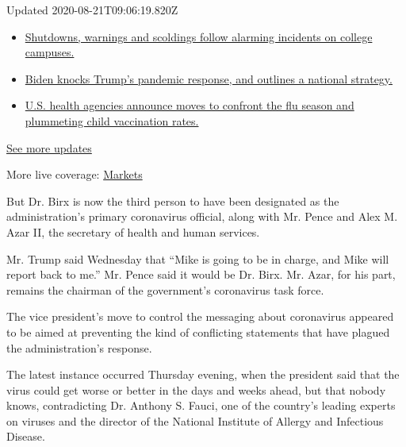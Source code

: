 Updated 2020-08-21T09:06:19.820Z

\begin{itemize}
\tightlist
\item
  \href{https://www.nytimes3xbfgragh.onion/2020/08/20/world/coronavirus-covid.html?action=click\&pgtype=Article\&state=default\&region=MAIN_CONTENT_1\&context=storylines_live_updates\#link-68774d88}{Shutdowns,
  warnings and scoldings follow alarming incidents on college campuses.}
\item
  \href{https://www.nytimes3xbfgragh.onion/2020/08/20/world/coronavirus-covid.html?action=click\&pgtype=Article\&state=default\&region=MAIN_CONTENT_1\&context=storylines_live_updates\#link-26b58724}{Biden
  knocks Trump's pandemic response, and outlines a national strategy.}
\item
  \href{https://www.nytimes3xbfgragh.onion/2020/08/20/world/coronavirus-covid.html?action=click\&pgtype=Article\&state=default\&region=MAIN_CONTENT_1\&context=storylines_live_updates\#link-4e542da3}{U.S.
  health agencies announce moves to confront the flu season and
  plummeting child vaccination rates.}
\end{itemize}

\href{https://www.nytimes3xbfgragh.onion/2020/08/20/world/coronavirus-covid.html?action=click\&pgtype=Article\&state=default\&region=MAIN_CONTENT_1\&context=storylines_live_updates}{See
more updates}

More live coverage:
\href{https://www.nytimes3xbfgragh.onion/live/2020/08/20/business/stock-market-today-coronavirus?action=click\&pgtype=Article\&state=default\&region=MAIN_CONTENT_1\&context=storylines_live_updates}{Markets}

But Dr. Birx is now the third person to have been designated as the
administration's primary coronavirus official, along with Mr. Pence and
Alex M. Azar II, the secretary of health and human services.

Mr. Trump said Wednesday that ``Mike is going to be in charge, and Mike
will report back to me.'' Mr. Pence said it would be Dr. Birx. Mr. Azar,
for his part, remains the chairman of the government's coronavirus task
force.

The vice president's move to control the messaging about coronavirus
appeared to be aimed at preventing the kind of conflicting statements
that have plagued the administration's response.

The latest instance occurred Thursday evening, when the president said
that the virus could get worse or better in the days and weeks ahead,
but that nobody knows, contradicting Dr. Anthony S. Fauci, one of the
country's leading experts on viruses and the director of the National
Institute of Allergy and Infectious Disease.

